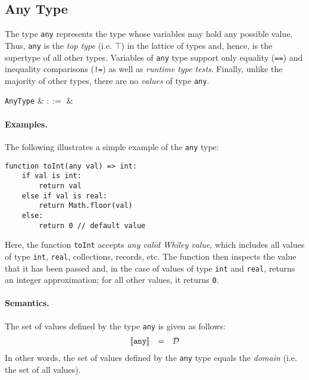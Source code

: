\subsection{Any Type}

The type \lstinline{any} represents the type whose variables may hold any possible value.  Thus, \lstinline{any} is the {\em top type} (i.e. $\top$) in the lattice of types and, hence, is the supertype of all other types.  Variables of \lstinline{any} type support only equality (\lstinline{==}) and inequality comparisons (\lstinline{!=}) as well as {\em runtime type tests}.  Finally, unlike the majority of other types, there are no {\em values} of type \lstinline{any}.

\begin{syntax}
  \verb+AnyType+ & $::=$ &  \\
\end{syntax}

\paragraph{Examples.}  The following illustrates a simple example of the \lstinline{any} type:

\begin{lstlisting}
function toInt(any val) => int:
    if val is int:
        return val
    else if val is real:
        return Math.floor(val)
    else:
        return 0 // default value        
\end{lstlisting}

Here, the function \lstinline{toInt} accepts {\em any valid Whiley value}, which includes all values of type \lstinline{int}, \lstinline{real}, collections, records, etc.  The function then inspects the value that it has been passed and, in the case of values of type \lstinline{int} and \lstinline{real}, returns an integer approximation; for all other values, it returns \lstinline{0}.

\paragraph{Semantics.}  The set of values defined by the type \lstinline{any} is given as follows:
\begin{displaymath}
\begin{array}{rcl}
\llbracket{\tt any}\rrbracket & = & \mathcal{D}\\
\end{array}
\end{displaymath}
In other words, the set of values defined by the \lstinline{any} type equals the {\em domain} (i.e. the set of all values).

